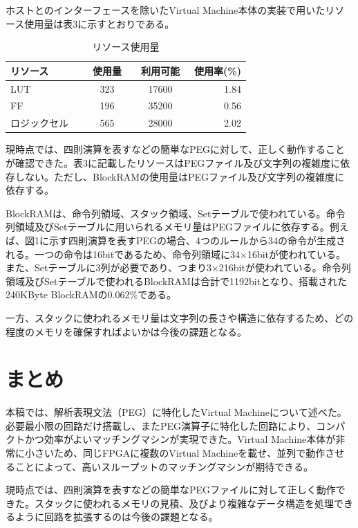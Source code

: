 \documentclass[submit,techrep]{ipsj}
\begin{document}
ホストとのインターフェースを除いたVirtual Machine本体の実装で用いたリソース使用量は表3に示すとおりである。

\begin{table}[h]
	\caption{リソース使用量}
	\centering
\begin{tabular}[t]{lccr}
	\hline\hline
	 リソース　& 使用量　&  利用可能　& 使用率(\%) \\\hline
	 LUT & 323 & 17600 & 1.84 \\
	 FF & 196 & 35200 & 0.56 \\
	 ロジックセル　& 565 & 28000 & 2.02 \\\hline
\end{tabular}
\end{table}
	 
現時点では、四則演算を表すなどの簡単なPEGに対して、正しく動作することが確認できた。表3に記載したリソースはPEGファイル及び文字列の複雑度に依存しない。ただし、BlockRAMの使用量はPEGファイル及び文字列の複雑度に依存する。

BlockRAMは、命令列領域、スタック領域、Setテーブルで使われている。命令列領域及びSetテーブルに用いられるメモリ量はPEGファイルに依存する。例えば、図1に示す四則演算を表すPEGの場合、4つのルールから34の命令が生成される。一つの命令は16bitであるため、命令列領域に34$\times$16bitが使われている。また、Setテーブルに3列が必要であり、つまり3$\times$216bitが使われている。命令列領域及びSetテーブルで使われるBlockRAMは合計で1192bitとなり、搭載された240KByte BlockRAMの0.062\%である。

一方、スタックに使われるメモリ量は文字列の長さや構造に依存するため、どの程度のメモリを確保すればよいかは今後の課題となる。\\






\section{まとめ}

本稿では、解析表現文法（PEG）に特化したVirtual Machineについて述べた。必要最小限の回路だけ搭載し、またPEG演算子に特化した回路により、コンパクトかつ効率がよいマッチングマシンが実現できた。Virtual Machine本体が非常に小さいため、同じFPGAに複数のVirtual Machineを載せ、並列で動作させることによって、高いスループットのマッチングマシンが期待できる。

現時点では、四則演算を表すなどの簡単なPEGファイルに対して正しく動作できた。スタックに使われるメモリの見積、及びより複雑なデータ構造を処理できるように回路を拡張するのは今後の課題となる。
\end{document}

